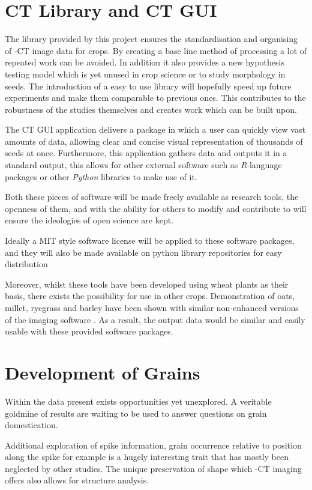 \documentclass[11pt]{report}
\begin{document}
\section{CT Library and CT GUI}
\label{sec:org4448d21}

The library provided by this project ensures the standardisation and organising of \textmu{}-CT image data for crops. By creating a base line method of processing a lot of repeated work can be avoided. In addition it also provides a new hypothesis testing model which is yet unused in crop science or to study morphology in seeds. The introduction of a easy to use library will hopefully speed up future experiments and make them comparable to previous ones. This contributes to the robustness of the studies themselves and creates work which can be built upon.

The CT GUI application delivers a package in which a user can quickly view vast amounts of data, allowing clear and concise visual representation of thousands of seeds at once. Furthermore, this application gathers data and outputs it in a standard output, this allows for other external software such as \emph{R}-language packages or other \emph{Python} libraries to make use of it.

Both these pieces of software will be made freely available as research tools, the openness of them, and with the ability for others to modify and contribute to will ensure the ideologies of open science are kept.

Ideally a MIT style software license will be applied to these software packages, and they will also be made available on python library repositories for easy distribution

Moreover, whilst these tools have been developed using wheat plants as their basis, there exists the possibility for use in other crops. Demonstration of oats, millet, ryegrass and barley have been shown with similar non-enhanced versions of the imaging software \cite{Hughes2017}. As a result, the output data would be similar and easily usable with these provided software packages.

\section{Development of Grains}
\label{sec:org6c51052}
Within the data present exists opportunities yet unexplored. A veritable goldmine of results are waiting to be used to answer questions on grain domestication.

Additional exploration of spike information, grain occurrence relative to position along the spike for example is a hugely interesting trait that has mostly been neglected by other studies. The unique preservation of shape which \textmu{}-CT imaging offers also allows for structure analysis.
\end{document}
